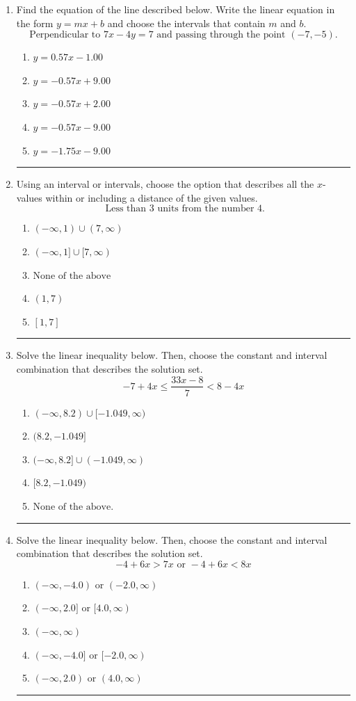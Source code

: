\documentclass[14pt]{extbook}
\newcommand{\litem}[1]{\item#1\hspace*{-1cm}\rule{\textwidth}{0.4pt}}
\begin{document}
\begin{enumerate}
{\begin{enumerate}[label=\Alph*.]
\end{enumerate} }
\litem{
Find the equation of the line described below. Write the linear equation in the form $ y=mx+b $ and choose the intervals that contain $m$ and $b$.\[ \text{Perpendicular to } 7 x - 4 y = 7 \text{ and passing through the point } (-7, -5). \]\begin{enumerate}[label=\Alph*.]
\item \( y = 0.57x - 1.00 \)
\item \( y = -0.57x + 9.00 \)
\item \( y = -0.57x + 2.00 \)
\item \( y = -0.57x - 9.00 \)
\item \( y = -1.75x - 9.00 \)

\end{enumerate} }
\litem{
Using an interval or intervals, choose the option that describes all the $x$-values within or including a distance of the given values.\[ \text{ Less than } 3 \text{ units from the number } 4. \]\begin{enumerate}[label=\Alph*.]
\item \( (-\infty, 1) \cup (7, \infty) \)
\item \( (-\infty, 1] \cup [7, \infty) \)
\item \( \text{None of the above} \)
\item \( (1, 7) \)
\item \( [1, 7] \)

\end{enumerate} }
\litem{
Solve the linear inequality below. Then, choose the constant and interval combination that describes the solution set.\[ -7 + 4 x \leq \frac{33 x - 8}{7} < 8 - 4 x \]\begin{enumerate}[label=\Alph*.]
\item \( (-\infty, 8.2) \cup [-1.049, \infty) \)
\item \( (8.2, -1.049] \)
\item \( (-\infty, 8.2] \cup (-1.049, \infty) \)
\item \( [8.2, -1.049) \)
\item \( \text{None of the above.} \)

\end{enumerate} }
\litem{
Solve the linear inequality below. Then, choose the constant and interval combination that describes the solution set.\[ -4 + 6 x > 7 x \text{ or } -4 + 6 x < 8 x \]\begin{enumerate}[label=\Alph*.]
\item \( (-\infty, -4.0) \text{ or } (-2.0, \infty) \)
\item \( (-\infty, 2.0] \text{ or } [4.0, \infty) \)
\item \( (-\infty, \infty) \)
\item \( (-\infty, -4.0] \text{ or } [-2.0, \infty) \)
\item \( (-\infty, 2.0) \text{ or } (4.0, \infty) \)


\end{enumerate}}
\end{enumerate}
\end{document}
